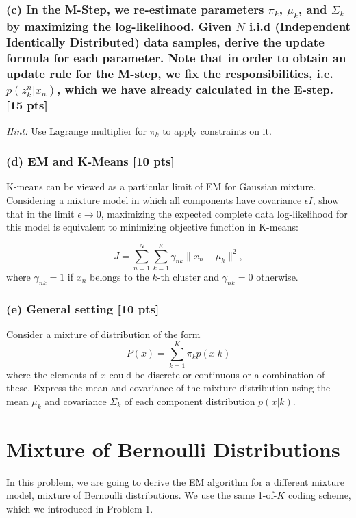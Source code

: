 \documentclass[twoside,10pt]{article}
\begin{document}
\subsubsection*{(c) In the M-Step, we re-estimate parameters $\pi_k$, $\mu_k$,
and $\Sigma_k$ by maximizing the log-likelihood. Given $N$ i.i.d (Independent
Identically Distributed) data samples, derive the update formula for
each parameter. Note that in order to obtain an update rule for the M-step, we fix the responsibilities, i.e. $p(z_k^n|x_n)$, which we have already calculated in the E-step. [15 pts]}

\emph{Hint:} Use Lagrange multiplier for $\pi_k$ to apply
constraints on it.

\subsubsection*{(d) EM and K-Means [10 pts]}
K-means can be viewed as a particular limit of EM for Gaussian
mixture. Considering a mixture model in which all components have
covariance $\epsilon I$, show that in the limit $\epsilon\to 0$,
maximizing the expected complete data log-likelihood for this model
is equivalent to minimizing objective function in K-means:

\begin{equation}
J = \sum_{n=1}^N\sum_{k=1}^K\gamma_{nk}\|x_n-\mu_k\|^2,\nonumber
\end{equation}
where $\gamma_{nk} = 1$ if $x_n$ belongs to the $k$-th cluster and $\gamma_{nk} = 0$ otherwise.

\subsubsection*{(e) General setting [10 pts]}

Consider a mixture of distribution of the form
\begin{equation}
P(x) = \sum_{k=1}^K \pi_k p(x|k)\nonumber
\end{equation}
where the elements of $x$ could be discrete or continuous or a
combination of these. Express the mean and covariance of the mixture
distribution using the mean $\mu_k$ and covariance $\Sigma_k$ of
each component distribution $p(x|k)$.

\vspace{1cm}


\iffalse
\section{Mixture of Bernoulli Distributions}
In this problem, we are going to derive the EM algorithm for a
different mixture model, mixture of Bernoulli distributions. We use
the same 1-of-$K$ coding scheme, which we introduced in Problem 1.
\end{document}
